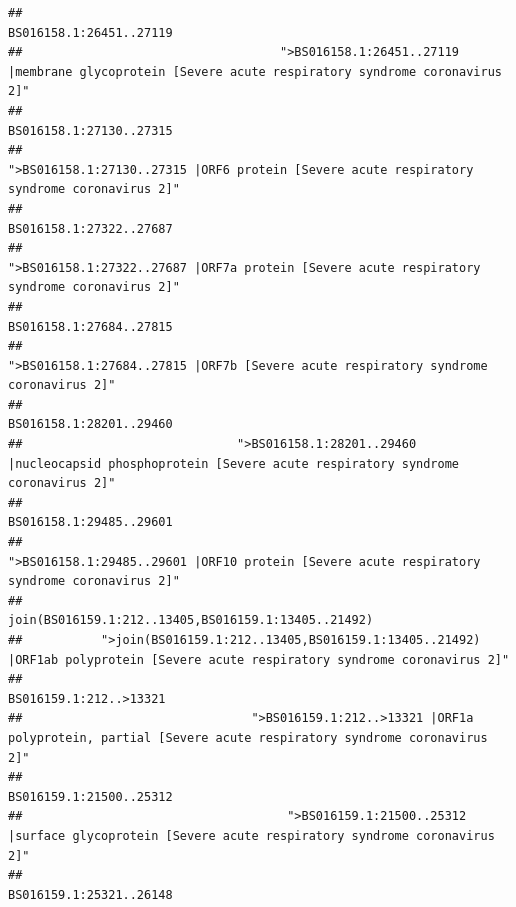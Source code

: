 \documentclass[
]{article}
\begin{document}
\begin{verbatim}
##                                                                                                                BS016158.1:26451..27119 
##                                    ">BS016158.1:26451..27119 |membrane glycoprotein [Severe acute respiratory syndrome coronavirus 2]" 
##                                                                                                                BS016158.1:27130..27315 
##                                             ">BS016158.1:27130..27315 |ORF6 protein [Severe acute respiratory syndrome coronavirus 2]" 
##                                                                                                                BS016158.1:27322..27687 
##                                            ">BS016158.1:27322..27687 |ORF7a protein [Severe acute respiratory syndrome coronavirus 2]" 
##                                                                                                                BS016158.1:27684..27815 
##                                                    ">BS016158.1:27684..27815 |ORF7b [Severe acute respiratory syndrome coronavirus 2]" 
##                                                                                                                BS016158.1:28201..29460 
##                              ">BS016158.1:28201..29460 |nucleocapsid phosphoprotein [Severe acute respiratory syndrome coronavirus 2]" 
##                                                                                                                BS016158.1:29485..29601 
##                                            ">BS016158.1:29485..29601 |ORF10 protein [Severe acute respiratory syndrome coronavirus 2]" 
##                                                                                    join(BS016159.1:212..13405,BS016159.1:13405..21492) 
##           ">join(BS016159.1:212..13405,BS016159.1:13405..21492) |ORF1ab polyprotein [Severe acute respiratory syndrome coronavirus 2]" 
##                                                                                                                 BS016159.1:212..>13321 
##                                ">BS016159.1:212..>13321 |ORF1a polyprotein, partial [Severe acute respiratory syndrome coronavirus 2]" 
##                                                                                                                BS016159.1:21500..25312 
##                                     ">BS016159.1:21500..25312 |surface glycoprotein [Severe acute respiratory syndrome coronavirus 2]" 
##                                                                                                                BS016159.1:25321..26148 

\end{verbatim}
\end{document}

